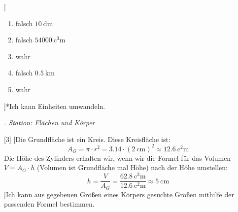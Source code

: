 \documentclass[
paper=a4,
fontsize=12pt,
headings=small,
parskip=half,
draft=false
]{scrartcl}
\newcounter{magicrownumbers}
\begin{document}
[%
	\begin{enumerate}[nosep]
	\item falsch $ \SI{10}{\deci\m} $
	\item falsch $ \SI{54000}{\cubic\centi\m} $
	\item wahr
	\item falsch $ \SI{0,5}{\kilo\m} $
	\item wahr
\end{enumerate}]*{Ich kann Einheiten umwandeln.}{\item \textit{. Station: Flächen und Körper}}[3]
[Die Grundfläche ist ein Kreis. Diese Kreisfläche ist: \[ A_G = \pi \cdot r^2 = \num{3,14} \cdot (\SI{2}{\centi\meter})^2 \approx \SI{12,6}{\square\centi\meter} \] Die Höhe des Zylinders erhalten wir, wenn wir die Formel für das Volumen $ V = A_G \cdot h $ (Volumen ist Grundfläche mal Höhe) nach der Höhe umstellen: \[ h = \frac{V}{A_G} = \frac{\SI{62,8}{\cubic\centi\meter}}{\SI{12,6}{\square\centi\meter}} \approx \SI{5}{\centi\meter} \]]{Ich kann aus gegebenen Größen eines Körpers gesuchte Größen mithilfe der passenden Formel bestimmen.}{}
\end{document}
